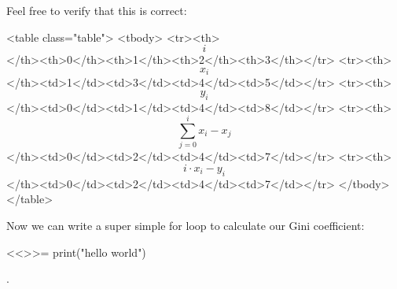 Feel free to verify that this is correct:

<table class="table">
  <tbody>
    <tr><th>$$i$$</th><th>0</th><th>1</th><th>2</th><th>3</th></tr>
    <tr><th>$$x_i$$</th><td>1</td><td>3</td><td>4</td><td>5</td></tr>
    <tr><th>$$y_i$$</th><td>0</td><td>1</td><td>4</td><td>8</td></tr>
    <tr><th>$$\sum_{j=0}^i x_i -
x_j$$</th><td>0</td><td>2</td><td>4</td><td>7</td></tr>
    <tr><th>$$i \cdot x_i -
y_i$$</th><td>0</td><td>2</td><td>4</td><td>7</td></tr>
  </tbody>
</table>

Now we can write a super simple for loop to calculate our Gini coefficient:

<<>>=
print("hello world")

.
\fi


\inx
\fin
\con
